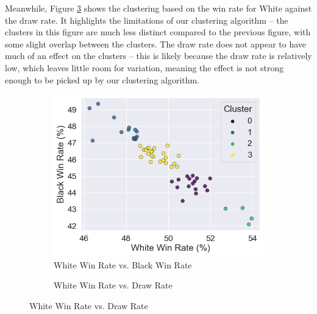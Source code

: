 \documentclass[a4paper, 11pt]{article}
\begin{document}
Meanwhile, Figure \ref{fig:baseOpeningsClusteredByGameResultsWhiteVersusDraw} shows the clustering based on the win rate for White against the draw rate. It highlights the limitations of our clustering algorithm -- the clusters in this figure are much less distinct compared to the previous figure, with some slight overlap between the clusters. The draw rate does not appear to have much of an effect on the clusters -- this is likely because the draw rate is relatively low, which leaves little room for variation, meaning the effect is not strong enough to be picked up by our clustering algorithm.

\begin{figure}[H]
    \centering
    \caption{Base Openings K-Means Clustered by Game Results}
    \begin{subfigure}{0.49\textwidth}
        \centering
        \caption{White Win Rate vs. Black Win Rate}
        \label{fig:baseOpeningsClusteredByGameResultsWhiteVersusBlack}
        \includegraphics[width=\textwidth]{Base Openings Clustered by Game Results (White Win Rate vs Black Win Rate).png}
    \end{subfigure}
    \hfill
    \begin{subfigure}{0.49\textwidth}
        \centering
        \caption{White Win Rate vs. Draw Rate}
        \label{fig:baseOpeningsClusteredByGameResultsWhiteVersusDraw}

\end{subfigure}
\end{figure}
\end{document}

